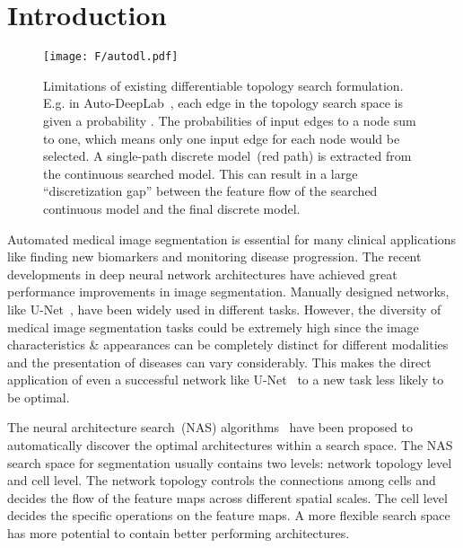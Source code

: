 \documentclass[final]{cvpr}
\begin{document}
\section{Introduction}
\label{s:intro}
\begin{figure}[t]
\begin{center}
\texttt{[image: F/autodl.pdf]}
\end{center}
  \caption{Limitations of existing differentiable topology search formulation. E.g. in Auto-DeepLab~\cite{liu2019auto}, each edge in the topology search space is given a probability . The probabilities of input edges to a node sum to one, which means only one input edge for each node would be selected. A single-path discrete model~(red path) is extracted from the continuous searched model. This can result in a large ``discretization gap'' between the feature flow of the searched continuous model and the final discrete model.}
\label{fig:ad}
\end{figure}
Automated medical image segmentation is essential for many clinical applications like finding new biomarkers and monitoring disease progression. The recent developments in deep neural network architectures have achieved great performance improvements in image segmentation. Manually designed networks, like U-Net~\cite{ronneberger2015unet}, have been widely used in different tasks. However, the diversity of medical image segmentation tasks could be extremely high since the image characteristics \& appearances can be completely distinct for different modalities and the presentation of diseases can vary considerably. This makes the direct application of even a successful network like U-Net~\cite{ronneberger2015unet} to a new task less likely to be optimal. 

The neural architecture search~(NAS) algorithms~\cite{zoph2016nas} have been proposed to automatically discover the optimal architectures within a search space. The NAS search space for segmentation usually contains two levels: network topology level and cell level. The network topology controls the connections among cells and decides the flow of the feature maps across different spatial scales. The cell level decides the specific operations on the feature maps. A more flexible search space has more potential to contain better performing architectures. 
\end{document}
